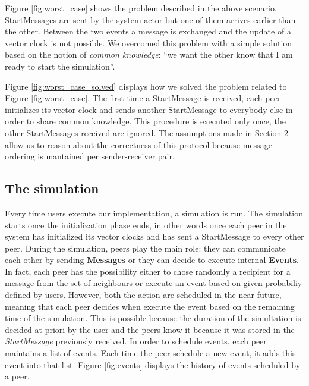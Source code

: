 \documentclass[11pt]{article}
\begin{document}


\noindent
Figure \ref{fig:worst_case} shows the problem described in the above scenario. StartMessages are sent by the system actor but one of them arrives earlier than the other. Between the two events a message is exchanged and the update of a vector clock is not possible. We overcomed this problem with a simple solution based on the notion of \textit{common knowledge}: ``we want the other know that I am ready to start the simulation''.



\noindent
Figure \ref{fig:worst_case_solved} displays how we solved the problem related to Figure \ref{fig:worst_case}. The first time a StartMessage is received, each peer initializes its vector clock and sends another StartMessage to everybody else in order to share common knowledge. This procedure is executed only once, the other StartMessages received are ignored. The assumptions made in Section 2 allow us to reason about the correctness of this protocol because message ordering is mantained per sender-receiver pair.

\subsection{The simulation}

Every time users execute our implementation, a simulation is run. The simulation starts once the initialization phase ends, in other words once each peer in the system has initialized its vector clocks and has sent a StartMessage to every other peer. During the simulation, peers play the main role: they can communicate each other by sending \textbf{Messages} or they can decide to execute internal \textbf{Events}. In fact, each peer has the possibility either to chose randomly a recipient for a message from the set of neighbours or execute an event based on given probabiliy defined by users. However, both the action are scheduled in the near future, meaning that each peer decides when execute the event based on the remaining time of the simulation. This is possible because the duration of the simultation is decided at priori by the user and the peers know it because it was stored in the \textit{StartMessage} previously received. In order to schedule events, each peer maintains a list of events. Each time the peer schedule a new event, it adds this event into that list. Figure \ref{fig:events} displays the history of events scheduled by a peer.
\end{document}
